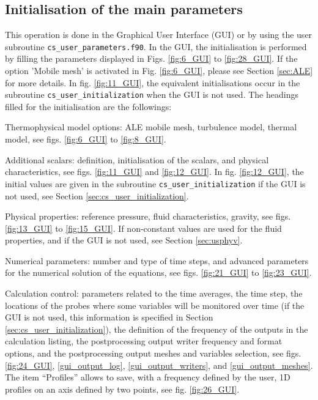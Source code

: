 {{%
\subsection{Initialisation of the main parameters}

This operation is done in the Graphical User Interface (GUI) or by using the user subroutine \texttt{cs\_user\_parameters.f90}.
In the GUI, the initialisation is performed by filling the parameters displayed in Figs. \ref{fig:6_GUI} to \ref{fig:28_GUI}. If the option 'Mobile mesh' is activated in Fig. \ref{fig:6_GUI}, please see Section \ref{sec:ALE} for more details. In fig. \ref{fig:11_GUI}, the equivalent initialisations occur in the subroutine \texttt{cs\_user\_initialization} when the GUI is not used.
The headings filled for the initialisation are the followings:
\begin{list}{-}{}
\item Thermophysical model options: ALE mobile mesh,
      turbulence model, thermal model, see figs. \ref{fig:6_GUI} to \ref{fig:8_GUI}.
\item Additional scalars: definition, initialisation of the scalars, and physical characteristics, see figs. \ref{fig:11_GUI} and \ref{fig:12_GUI}. In fig. \ref{fig:12_GUI}, the initial values are given in the subroutine \texttt{cs\_user\_initialization} if the GUI is not used, see Section \ref{sec:cs_user_initialization}.
\item Physical properties: reference pressure, fluid characteristics, gravity, see figs. \ref{fig:13_GUI} to \ref{fig:15_GUI}. If non-constant values are used for the fluid properties, and if the GUI is not used, see Section \ref{sec:usphyv}.
\item Numerical parameters: number and type of time steps, and advanced parameters for the numerical solution of the equations, see figs. \ref{fig:21_GUI} to \ref{fig:23_GUI}.
\item Calculation control: parameters related to the time averages, the time step, the
      locations of the probes where some variables will be monitored over time
      (if the GUI is not used, this information is specified in Section
      \ref{sec:cs_user_initialization}), the definition of the frequency of the outputs in the calculation
      listing, the postprocessing output writer frequency and format options, and
      the postprocessing output meshes and variables selection, see
      figs. \ref{fig:24_GUI}, \ref{gui_output_log}, \ref{gui_output_writers},
      and \ref{gui_output_meshes}. The item ``Profiles'' allows to save, with a
      frequency defined by the user, 1D profiles on an axis defined by two
      points, see fig. \ref{fig:26_GUI}.
\end{list}

}}

